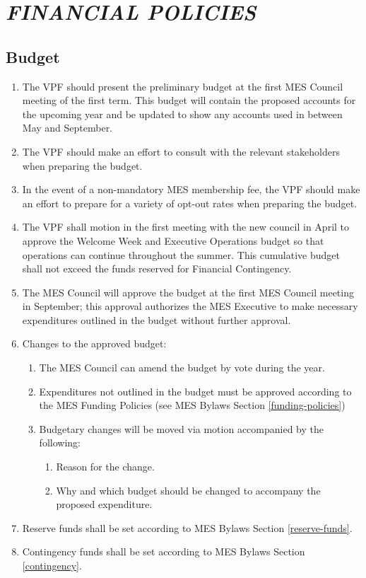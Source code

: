 \hypertarget{financial-policies}{%
 \section{\texorpdfstring{\emph{FINANCIAL
     POLICIES}}{FINANCIAL POLICIES}}
 \label{financial-policies}}

\hypertarget{budget}{%
 \subsection{Budget}
 \label{budget}}
\begin{enumerate}
 \item
  The VPF should present the preliminary budget at the first MES Council
  meeting of the first term. This budget will contain the proposed
  accounts for the upcoming year and be updated to show any accounts
  used in between May and September.
 \item
  The VPF should make an effort to consult with the relevant
  stakeholders when preparing the budget.
 \item
  In the event of a non-mandatory MES membership fee, the VPF should
  make an effort to prepare for a variety of opt-out rates when
  preparing the budget.
 \item
  The VPF shall motion in the first meeting with the new council in
  April to approve the Welcome Week and Executive Operations budget so
  that operations can continue throughout the summer. This cumulative
  budget shall not exceed the funds reserved for Financial Contingency.
 \item
  The MES Council will approve the budget at the first MES Council
  meeting in September; this approval authorizes the MES Executive to
  make necessary expenditures outlined in the budget without further
  approval.
 \item
  Changes to the approved budget:

  \begin{enumerate}
   \item
    The MES Council can amend the budget by vote during the year.
   \item
    Expenditures not outlined in the budget must be approved according
    to the MES Funding Policies (see MES Bylaws Section \ref{funding-policies})
   \item
    Budgetary changes will be moved via motion accompanied by the
    following:

    \begin{enumerate}
     \item
      Reason for the change.
     \item
      Why and which budget should be changed to accompany the proposed
      expenditure.
    \end{enumerate}
  \end{enumerate}
 \item
  Reserve funds shall be set according to MES Bylaws Section \ref{reserve-funds}.
 \item
  Contingency funds shall be set according to MES Bylaws Section
  \ref{contingency}.

\end{enumerate}

